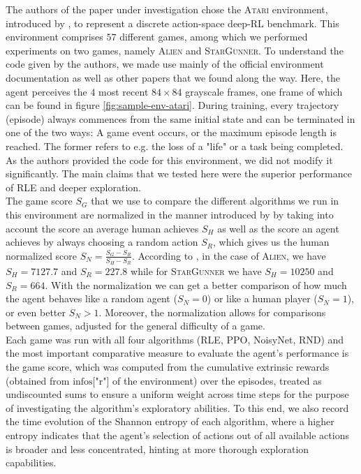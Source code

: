 \documentclass[10pt]{article} %
\begin{document}
\noindent The authors of the paper under investigation chose the \textsc{Atari} environment, introduced by \cite{atari-introduction}, to represent a discrete action-space deep-RL benchmark. This environment comprises $57$ different games, among which we performed experiments on two games, namely \textsc{Alien} and \textsc{StarGunner}. To understand the code given by the authors, we made use mainly of the official environment documentation as well as other papers that we found along the way. Here, the agent perceives the $4$ most recent $84\times84$ grayscale frames, one frame of which can be found in figure \ref{fig:sample-env-atari}. During training, every trajectory (episode) always commences from the same initial state and can be terminated in one of the two ways: A game event occurs, or the maximum episode length is reached. The former refers to e.g. the loss of a "life" or a task being completed. As the authors provided the code for this environment, we did not modify it significantly. The main claims that we tested here were the superior performance of RLE and deeper exploration.\\

\noindent The game score $S_{G}$ that we use to compare the different algorithms we run in this environment are normalized in the manner introduced by \cite{agent57} by taking into account the score an average human achieves $S_{H}$ as well as the score an agent achieves by always choosing a random action $S_{R}$, which gives us the human normalized score $S_{N} = \frac{S_{G} - S_{R}}{S_{H} - S_{R}}$. According to \cite{agent57}, in the case of \textsc{Alien}, we have $S_{H} = 7127.7$ and $S_{R} = 227.8$ while for \textsc{StarGunner} we have $S_{H} = 10250$ and $S_{R} = 664$. With the normalization we can get a better comparison of how much the agent behaves like a random agent ($S_{N} = 0$) or like a human player ($S_{N} = 1$), or even better $S_{N} > 1$. Moreover, the normalization allows for comparisons between games, adjusted for the general difficulty of a game.\\

\noindent Each game was run with all four algorithms (RLE, PPO, NoisyNet, RND) and the most important comparative measure to evaluate the agent's performance is the game score, which was computed from the cumulative extrinsic rewards (obtained from $\text{infos["r"]}$ of the environment) over the episodes, treated as undiscounted sums to ensure a uniform weight across time steps for the purpose of investigating the algorithm's exploratory abilities. To this end, we also record the time evolution of the Shannon entropy of each algorithm, where a higher entropy indicates that the agent's selection of actions out of all available actions is broader and less concentrated, hinting at more thorough exploration capabilities.
\end{document}
